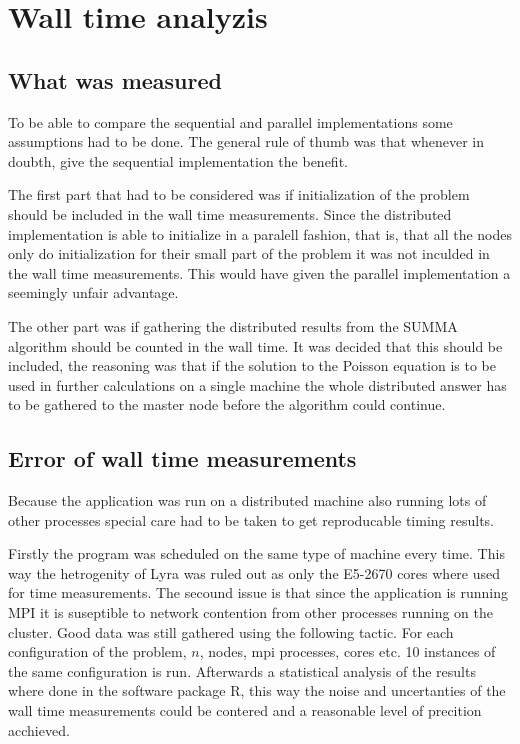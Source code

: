 \documentclass{article}
\begin{document}
\section{Wall time analyzis}

\subsection{What was measured}
To be able to compare the sequential and parallel implementations some assumptions had to
be done. The general rule of thumb was that whenever in doubth, give the sequential implementation
the benefit.

The first part that had to be considered was if initialization of the problem should be included
in the wall time measurements. Since the distributed implementation is able to initialize in
a paralell fashion, that is, that all the nodes only do initialization for their small part of the
problem it was not inculded in the wall time measurements. This would have given the parallel implementation
a seemingly unfair advantage.

The other part was if gathering the distributed results from the SUMMA algorithm
should be counted in the wall time. It was decided that this should be included,
the reasoning was that if the solution to the Poisson equation is to be used in
further calculations on a single machine the whole distributed answer has to be
gathered to the master node before the algorithm could continue.

\subsection{Error of wall time measurements}
Because the application was run on a distributed machine also running lots of
other processes special care had to be taken to get reproducable timing results.

Firstly the program was scheduled on the same type of machine every time. This
way the hetrogenity of Lyra was ruled out as only the E5-2670 cores where used
for time measurements. The secound issue is that since the application is running
MPI it is suseptible to network contention from other processes running on the
cluster. Good data was still gathered using the following tactic. For each configuration
of the problem, $n$, nodes, mpi processes, cores etc. 10 instances of the same
configuration is run. Afterwards a statistical analysis of the results where done
in the software package R\cite{r-project}, this way the noise and uncertanties of the
wall time measurements could be contered and a reasonable level of precition acchieved.
\end{document}
